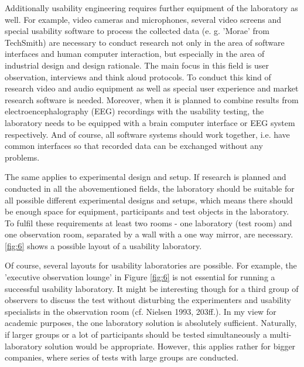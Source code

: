 \begin{
}[h]
\begin{styleBodyTextIndent}
Additionally usability engineering requires further equipment of the laboratory as well. For example, video cameras and microphones, several video screens and special usability software to process the collected data (e. g. 'Morae' from TechSmith) are necessary to conduct research not only in the area of software interfaces and human computer interaction, but especially in the area of industrial design and design rationale. The main focus in this field is user observation, interviews and think aloud protocols. To conduct this kind of research video and audio equipment as well as special user experience and market research software is needed. Moreover, when it is planned to combine results from electroencephalography (EEG) recordings with the usability testing, the laboratory needs to be equipped with a brain computer interface or EEG system respectively. And of course, all software systems should work together, i.e. have common interfaces so that recorded data can be exchanged without any problems.
\end{styleBodyTextIndent}

\begin{styleBodyTextIndent}
The same applies to experimental design and setup. If research is planned and conducted in all the abovementioned fields, the laboratory should be suitable for all possible different experimental designs and setups, which means there should be enough space for equipment, participants and test objects in the laboratory. To fulfil these requirements at least two rooms - one laboratory (test room) and one observation room, separated by a wall with a one way mirror, are necessary. \ref{fig:6} shows a possible layout of a usability laboratory.
\end{styleBodyTextIndent}

\begin{styleBodyTextIndent}
Of course, several layouts for usability laboratories are possible. For example, the 'executive observation lounge' in Figure \ref{fig:6} is not essential for running a successful usability laboratory. It might be interesting though for a third group of observers to discuss the test without disturbing the experimenters and usability specialists in the observation room (cf. Nielsen 1993, 203ff.). In my view for academic purposes, the one laboratory solution is absolutely sufficient. Naturally, if larger groups or a lot of participants should be tested simultaneously a multi-laboratory solution would be appropriate. However, this applies rather for bigger companies, where series of tests with large groups are conducted.
\end{styleBodyTextIndent}


\end{
}
